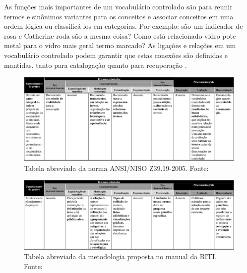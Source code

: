 As funções mais importantes de um vocabulário controlado são para reunir termos e sinônimos variantes para os conceitos e
associar conceitos em uma ordem lógica ou classificá-los em categorias. Por exemplo: são um indicador de rosa e Catherine
roda são a mesma coisa? Como está relacionado vidro pote metal para o vidro mais geral termo marcado? As ligações e 
relações em um vocabulário controlado podem garantir que estas conexões são definidas e mantidas, tanto para catalogação
quanto para recuperação \cite{VariosAutores2009}.

\begin{figure}[h] 
\centering 
\includegraphics[scale=0.4]{Figuras/13.png} 
\caption[Tabela abreviada da norma ANSI/NISO Z39.19-2005]
{Tabela abreviada da norma ANSI/NISO Z39.19-2005. Fonte: \cite{DanielaLucas2008}}
\end{figure}

\begin{figure}[h]
\centering 
\includegraphics[scale=0.4]{Figuras/14.png} 
\caption[Tabela abreviada da metodologia proposta no manual da BITI]
{Tabela abreviada da metodologia proposta no manual da BITI. Fonte: \cite{DanielaLucas2008}}
\end{figure}